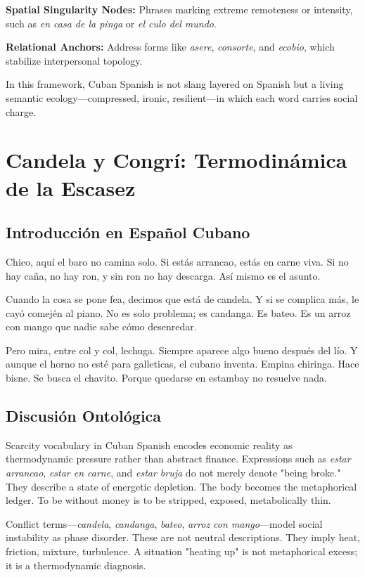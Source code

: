\documentclass[12pt]{article}
\begin{document}
\textbf{Spatial Singularity Nodes:} Phrases marking extreme remoteness or intensity, such as \textit{en casa de la pinga} or \textit{el culo del mundo}.

\textbf{Relational Anchors:} Address forms like \textit{asere}, \textit{consorte}, and \textit{ecobio}, which stabilize interpersonal topology.

In this framework, Cuban Spanish is not slang layered on Spanish but a living semantic ecology---compressed, ironic, resilient---in which each word carries social charge.

\section{Candela y Congrí: Termodinámica de la Escasez}

\subsection*{Introducción en Español Cubano}

Chico, aquí el baro no camina solo. Si estás arrancao, estás en carne viva. Si no hay caña, no hay ron, y sin ron no hay descarga. Así mismo es el asunto.

Cuando la cosa se pone fea, decimos que está de candela. Y si se complica más, le cayó comején al piano. No es solo problema; es candanga. Es bateo. Es un arroz con mango que nadie sabe cómo desenredar.

Pero mira, entre col y col, lechuga. Siempre aparece algo bueno después del lío. Y aunque el horno no esté para galleticas, el cubano inventa. Empina chiringa. Hace bisne. Se busca el chavito. Porque quedarse en estambay no resuelve nada.

\subsection*{Discusión Ontológica}

Scarcity vocabulary in Cuban Spanish encodes economic reality as thermodynamic pressure rather than abstract finance. Expressions such as \textit{estar arrancao}, \textit{estar en carne}, and \textit{estar bruja} do not merely denote "being broke." They describe a state of energetic depletion. The body becomes the metaphorical ledger. To be without money is to be stripped, exposed, metabolically thin.

Conflict terms---\textit{candela}, \textit{candanga}, \textit{bateo}, \textit{arroz con mango}---model social instability as phase disorder. These are not neutral descriptions. They imply heat, friction, mixture, turbulence. A situation "heating up" is not metaphorical excess; it is a thermodynamic diagnosis.
\end{document}
